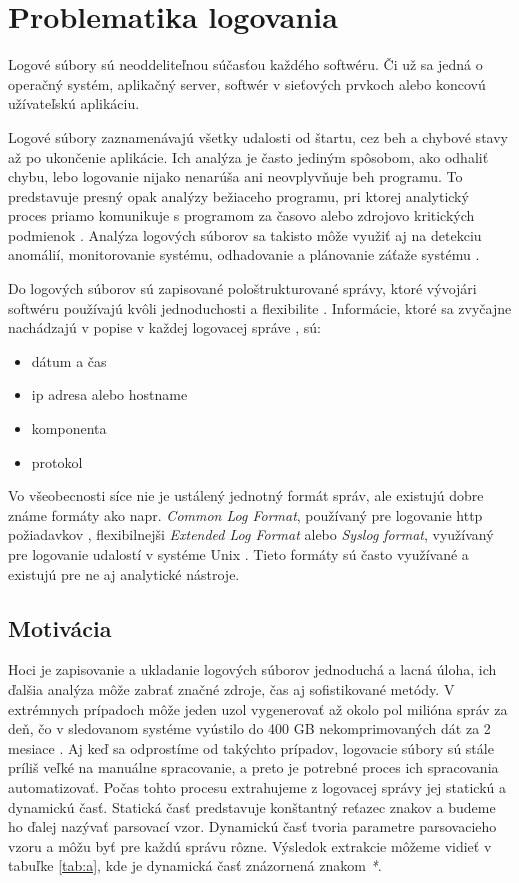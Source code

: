 \chapter{Problematika logovania}

Logové súbory sú neoddeliteľnou súčasťou každého softwéru. Či už sa jedná o operačný systém, aplikačný server, softwér v sieťových prvkoch alebo koncovú užívateľskú aplikáciu. 
\par Logové súbory zaznamenávajú všetky udalosti od štartu, cez beh a chybové stavy až po ukončenie aplikácie. Ich analýza je často jediným spôsobom, ako odhaliť chybu, lebo logovanie nijako nenarúša ani neovplyvňuje beh programu. To predstavuje presný opak analýzy bežiaceho programu, pri ktorej analytický proces priamo komunikuje s programom za časovo alebo zdrojovo kritických podmienok  \parencite{jvaldman}. Analýza logových súborov sa takisto môže využiť aj na detekciu anomálií, monitorovanie systému, odhadovanie a plánovanie záťaže systému \parencite{logengineering}.
\par Do logových súborov sú zapisované pološtrukturované správy, ktoré vývojári softwéru používajú kvôli jednoduchosti a flexibilite \parencite{he2016, ibm}. Informácie, ktoré sa zvyčajne nachádzajú v popise v každej logovacej správe \parencite{weblog, datapreprocessing, sshd}, sú:
\begin{itemize}
  \item dátum a čas
  \item ip adresa alebo hostname
  \item komponenta
  \item protokol
\end{itemize}
\par Vo všeobecnosti síce nie je ustálený jednotný formát správ, ale existujú dobre známe formáty ako napr. \emph{Common Log Format}, používaný pre logovanie http požiadavkov \parencite{CLF} , flexibilnejši \emph{Extended Log Format} \parencite{ELF} alebo \emph{Syslog format}, využívaný pre logovanie udalostí v systéme Unix \parencite{syslog}. Tieto formáty sú často využívané a existujú pre ne aj analytické nástroje. \

\section{Motivácia}

\par Hoci je zapisovanie a ukladanie logových súborov jednoduchá a lacná úloha, ich ďalšia analýza môže zabrať značné zdroje, čas aj sofistikované metódy. V extrémnych prípadoch môže jeden uzol vygenerovať až okolo pol milióna správ za deň, čo v sledovanom systéme vyústilo do 400 GB nekomprimovaných dát za 2 mesiace \parencite{google}. Aj keď sa odprostíme od takýchto prípadov, logovacie súbory sú stále príliš veľké na manuálne spracovanie, a preto je potrebné proces ich spracovania automatizovať. Počas tohto procesu extrahujeme z logovacej správy jej statickú a dynamickú časť. Statická časť predstavuje konštantný reťazec znakov a budeme ho ďalej nazývať parsovací vzor. Dynamickú časť tvoria parametre parsovacieho vzoru a môžu byť pre každú správu rôzne. Výsledok extrakcie môžeme vidieť v tabuľke \ref{tab:a}, kde je dynamická časť znázornená znakom \emph{*}. 

